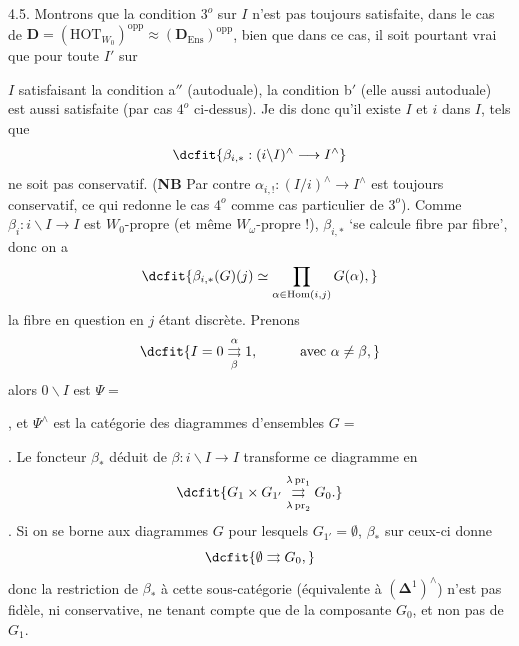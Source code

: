 \documentclass[11pt]{article}
\newcommand{\printedpage}[1]{\marginpar{\footnotesize p.~#1}}
\def\dcprintedpending{}
\newcommand{\msp}[1]{\marginpar{\footnotesize\raggedright
  \ifx\dcprintedpending\empty\else p.~\dcprintedpending\par\fi
  [#1]}\gdef\dcprintedpending{}}
\newcommand{\bD}{\mathbf{D}}
\begin{document}
4.5. Montrons que la condition $3^o$ sur $I$ n'est pas toujours satisfaite, dans le cas de $\bD = (\mathrm{HOT}_{W_0})^{\mathrm{opp}} \approx (\bD_{\mathrm{Ens}})^{\mathrm{opp}}$, bien que dans ce cas, il soit pourtant vrai que pour toute $I'$ sur

\printedpage{39}

$I$ satisfaisant la condition a$''$ (autoduale), la condition b$'$ (elle aussi autoduale) est aussi satisfaite (par cas $4^o$ ci-dessus). Je dis donc qu'il existe $I$ et $i$ dans $I$, tels que
\[
\dcfit{\beta_{i,*} : (i\backslash I)^\wedge \longrightarrow I^\wedge
}
\]
ne soit pas conservatif. (\textbf{NB} Par contre $\alpha_{i,!} : (I/i)^\wedge \longrightarrow I^\wedge$ est toujours conservatif, ce qui redonne le cas $4^o$ comme cas particulier de $3^o$). Comme $\beta_i : i\backslash I \longrightarrow I$ est $W_0$-propre (et même $W_\omega$-propre !), $\beta_{i,*}$ `se calcule fibre par fibre', donc on a
\msp{page 64}
\[
\dcfit{\beta_{i,*}(G)(j) \simeq \prod_{\alpha\in\mathrm{Hom}(i,j)} G(\alpha),
}
\]
la fibre en question en $j$ étant discrète. Prenons
\[
\dcfit{I = 0 \underset{\beta}{\overset{\alpha}{\rightrightarrows}} 1, \qquad\quad \text{avec } \alpha \neq \beta,
}
\]
alors $0\backslash I$ est $\Psi = {}$, et $\Psi^\wedge$ est la catégorie des diagrammes d'ensembles $G = {}$. Le foncteur $\beta_*$ déduit de $\beta : i\backslash I \longrightarrow I$ transforme ce diagramme en
\[
\dcfit{G_1 \times G_{1'} \underset{\lambda\,\mathrm{pr}_2}{\overset{\lambda\,\mathrm{pr}_1}{\rightrightarrows}} G_0.
}
\]
. Si on se borne aux diagrammes $G$ pour lesquels $G_{1'} = \emptyset$, $\beta_*$ sur ceux-ci donne
\[
\dcfit{\emptyset \rightrightarrows G_0,
}
\]
donc la restriction de $\beta_*$ à cette sous-catégorie (équivalente à $(\boldsymbol{\Delta}^1)^\wedge$) n'est pas fidèle, ni conservative, ne tenant compte que de la composante $G_0$, et non pas de $G_1$.
\end{document}
